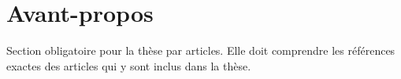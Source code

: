 \chapter*{Avant-propos}

Section obligatoire pour la thèse par articles. Elle doit comprendre les références exactes des articles qui y sont inclus dans la thèse.